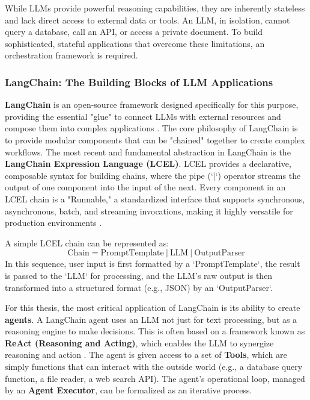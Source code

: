 While LLMs provide powerful reasoning capabilities, they are inherently stateless and lack direct access to external data or tools. An LLM, in isolation, cannot query a database, call an API, or access a private document. To build sophisticated, stateful applications that overcome these limitations, an orchestration framework is required.

\subsubsection{LangChain: The Building Blocks of LLM Applications}
\label{subsubsec:langchain_building_blocks}

\textbf{LangChain} is an open-source framework designed specifically for this purpose, providing the essential "glue" to connect LLMs with external resources and compose them into complex applications \cite{barua2024llmagentsreview,yu2025agentworkflow}. The core philosophy of LangChain is to provide modular components that can be "chained" together to create complex workflows. The most recent and fundamental abstraction in LangChain is the \textbf{LangChain Expression Language (LCEL)}. LCEL provides a declarative, composable syntax for building chains, where the pipe (`|`) operator streams the output of one component into the input of the next. Every component in an LCEL chain is a "Runnable," a standardized interface that supports synchronous, asynchronous, batch, and streaming invocations, making it highly versatile for production environments \cite{yu2025agentworkflow, pospech2025metagraph}.

A simple LCEL chain can be represented as:
$$ \text{Chain} = \text{PromptTemplate} \ | \ \text{LLM} \ | \ \text{OutputParser} $$
In this sequence, user input is first formatted by a `PromptTemplate`, the result is passed to the `LLM` for processing, and the LLM's raw output is then transformed into a structured format (e.g., JSON) by an `OutputParser`.

For this thesis, the most critical application of LangChain is its ability to create \textbf{agents}. A LangChain agent uses an LLM not just for text processing, but as a reasoning engine to make decisions. This is often based on a framework known as \textbf{ReAct (Reasoning and Acting)}, which enables the LLM to synergize reasoning and action \cite{yao2022react, barua2024llmagentsreview}. The agent is given access to a set of \textbf{Tools}, which are simply functions that can interact with the outside world (e.g., a database query function, a file reader, a web search API). The agent's operational loop, managed by an \textbf{Agent Executor}, can be formalized as an iterative process.

